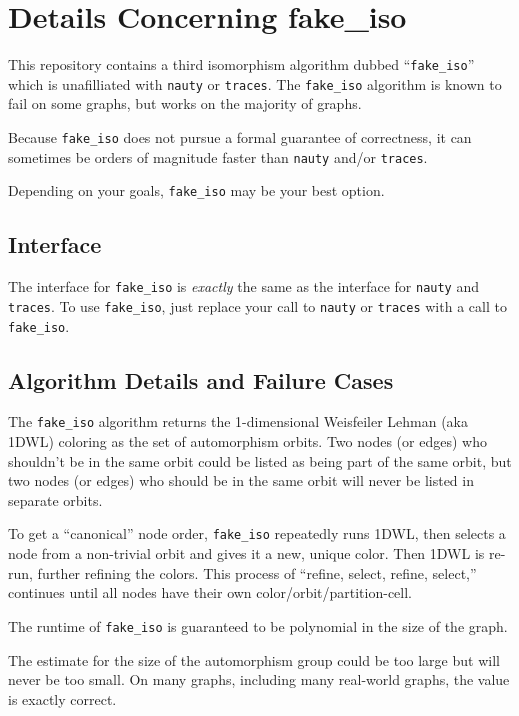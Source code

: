 \documentclass{article}
\begin{document}
\newpage

\section{Details Concerning fake\_iso}\label{sec:fake_iso}

This repository contains a third isomorphism algorithm dubbed ``\verb|fake_iso|'' which is unafilliated with \verb|nauty| or \verb|traces|. The \verb|fake_iso| algorithm is known to fail on some graphs, but works on the majority of graphs.

Because \verb|fake_iso| does not pursue a formal guarantee of correctness, it can sometimes be orders of magnitude faster than \verb|nauty| and/or \verb|traces|.

Depending on your goals, \verb|fake_iso| may be your best option.

\subsection{Interface}

The interface for \verb|fake_iso| is \emph{exactly} the same as the interface for \verb|nauty| and \verb|traces|. To use \verb|fake_iso|, just replace your call to \verb|nauty| or \verb|traces| with a call to \verb|fake_iso|.


\subsection{Algorithm Details and Failure Cases}

The \verb|fake_iso| algorithm returns the 1-dimensional Weisfeiler Lehman (aka 1DWL) coloring as the set of automorphism orbits. Two nodes (or edges) who shouldn't be in the same orbit could be listed as being part of the same orbit, but two nodes (or edges) who should be in the same orbit will never be listed in separate orbits.

To get a ``canonical'' node order, \verb|fake_iso| repeatedly runs 1DWL, then selects a node from a non-trivial orbit and gives it a new, unique color. Then 1DWL is re-run, further refining the colors. This process of ``refine, select, refine, select,'' continues until all nodes have their own color/orbit/partition-cell.

The runtime of \verb|fake_iso| is guaranteed to be polynomial in the size of the graph.

The estimate for the size of the automorphism group could be too large but will never be too small. On many graphs, including many real-world graphs, the value is exactly correct.
\end{document}

